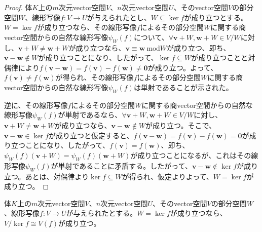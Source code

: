 \documentclass[dvipdfmx]{jsarticle}
\begin{document}
\begin{proof}
体$K$上の$m$次元vector空間$V$、$n$次元vector空間$U$、そのvector空間$V$の部分空間$W$、線形写像$f:V \rightarrow U$が与えられたとし、$W \subseteq \ker f$が成り立つとする。$W = \ker f$が成り立つなら、その線形写像$f$によるその部分空間$W$に関する商vector空間からの自然な線形写像$\psi_{W}(f)$について、$\forall\mathbf{v} + W,\mathbf{w} + W \in {V}/{W}$に対し、$\mathbf{v} + W \neq \mathbf{w} + W$が成り立つなら、$\mathbf{v} \equiv \mathbf{w}\ \mathrm{mod}W$が成り立つ、即ち、$\mathbf{v} - \mathbf{w} \notin W$が成り立つことになり、したがって、$\ker f \subseteq W$が成り立つことと対偶律により$f\left( \mathbf{v} - \mathbf{w} \right) = f\left( \mathbf{v} \right) - f\left( \mathbf{w} \right) \neq \mathbf{0}$が成り立つ。よって、$f\left( \mathbf{v} \right) \neq f\left( \mathbf{w} \right)$が得られ、その線形写像$f$によるその部分空間$W$に関する商vector空間からの自然な線形写像$\psi_{W}(f)$は単射であることが示された。\par
逆に、その線形写像$f$によるその部分空間$W$に関する商vector空間からの自然な線形写像$\psi_{W}(f)$が単射であるなら、$\forall\mathbf{v} + W,\mathbf{w} + W \in {V}/{W}$に対し、$\mathbf{v} + W \neq \mathbf{w} + W$が成り立つなら、$\mathbf{v} - \mathbf{w} \notin W$が成り立つ。そこで、$\mathbf{v} - \mathbf{w} \in \ker f$が成り立つと仮定すると、$f\left( \mathbf{v} - \mathbf{w} \right) = f\left( \mathbf{v} \right) - f\left( \mathbf{w} \right) = \mathbf{0}$が成り立つことになり、したがって、$f\left( \mathbf{v} \right) = f\left( \mathbf{w} \right)$、即ち、$\psi_{W}(f)\left( \mathbf{v} + W \right) = \psi_{W}(f)\left( \mathbf{w} + W \right)$が成り立つことになるが、これはその線形写像$\psi_{W}(f)$が単射であることに矛盾する。したがって、$\mathbf{v} - \mathbf{w} \notin \ker f$が成り立つ。あとは、対偶律より$\ker f \subseteq W$が得られ、仮定よりよって、$W = \ker f$が成り立つ。
\end{proof}
\begin{thm}\label{2.4.4.5}
体$K$上の$m$次元vector空間$V$、$n$次元vector空間$U$、そのvector空間$V$の部分空間$W$、線形写像$f:V \rightarrow U$が与えられたとする。$W = \ker f$が成り立つなら、${V}/{\ker f} \cong V(f)$が成り立つ。
\end{thm}
\end{document}
